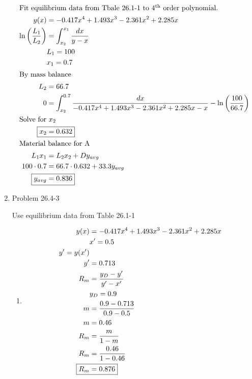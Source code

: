 \documentclass[12pt]{article}
\begin{document}
\begin{enumerate}
    \begin{align*}
        \intertext{Fit equilibrium data from Tbale 26.1-1 to 4$^{\text{th}}$ order polynomial.}
        y(x) &= -0.417 x^4 + 1.493 x^3 - 2.361 x^2 + 2.285 x \\
        \ln \left(\frac{L_1}{L_2}\right) &= \int_{x_2}^{x_1} \frac{dx}{y-x} \\
        & L_1 = 100 \\
        & x_1 = 0.7 \\
        \intertext{By mass balance}
        L_2 &= 66.7 \\
        0 &= \int_{x_2}^{0.7} \frac{dx}{-0.417 x^4 + 1.493 x^3 - 2.361 x^2 + 2.285 x - x} - \ln \left(\frac{100}{66.7}\right) \\
        \intertext{Solve for $x_2$}
        \Aboxed{x_2 &= 0.632} \\
        \intertext{Material balance for A}
        L_1 x_1 &= L_2 x_2 + D y_{avg} \\
        100 \cdot 0.7 &= 66.7 \cdot 0.632 + 33.3 y_{avg} \\
        \Aboxed{y_{avg} &= 0.836}
    \end{align*}

\newpage
    \item Problem 26.4-3
    
    Use equilibrium data from Table 26.1-1
    
    \begin{enumerate}
        \item 
        \begin{align*}
            y(x) &= -0.417 x^4 + 1.493 x^3 - 2.361 x^2 + 2.285 x \\
            & x' = 0.5 \\
            y' = y(x') \\
            y' &= 0.713 \\
            R_m &= \frac{y_D - y'}{y' - x'} \\
            & y_D = 0.9 \\
            m &= \frac{0.9 - 0.713}{0.9 - 0.5} \\
            m &= 0.46 \\
            R_m &= \frac{m}{1 - m} \\
            R_m &= \frac{0.46}{1 - 0.46} \\
            \Aboxed{R_m &= 0.876}
        \end{align*}


\end{enumerate}
\end{enumerate}
\end{document}
